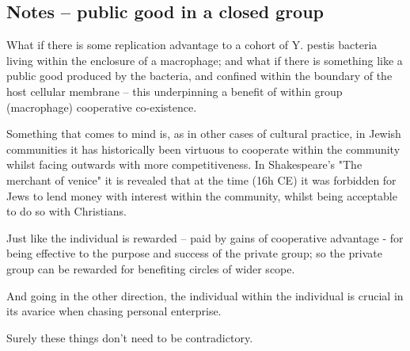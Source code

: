 %
%
%

\subsection*{Notes -- public good in a closed group}

What if there is some replication advantage to a cohort of Y. pestis bacteria living within the enclosure of a macrophage; and what if there is something like a public good produced by the bacteria, and confined within the boundary of the host cellular membrane -- this underpinning a benefit of within group (macrophage) cooperative co-existence. \par 

\vspace{10pt}
\noindent
Something that comes to mind is,  as in other cases of cultural practice,  in Jewish communities it has historically been virtuous to cooperate within the community whilst facing outwards with more competitiveness.  In Shakespeare's "The merchant of venice" it is revealed that at the time (16h CE) it was forbidden for Jews to lend money with interest within the community,  whilst being acceptable to do so with Christians. \par

\vspace{10pt}
\noindent
Just like the individual is rewarded -- paid by gains of cooperative advantage - for being effective to the purpose and success of the private group; so the private group can be rewarded for benefiting circles of wider scope.\par 
And going in the other direction, the individual within the individual is crucial in its avarice when chasing personal enterprise. \par 
Surely these things don't need to be contradictory. 



